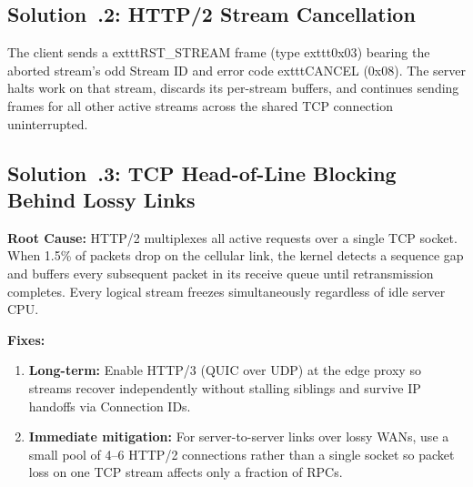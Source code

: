 \subsection{Solution~\thechapter.2: HTTP/2 Stream Cancellation}
The client sends a 	exttt{RST\_STREAM} frame (type 	exttt{0x03}) bearing the aborted stream's odd Stream ID and error code 	exttt{CANCEL (0x08)}. The server halts work on that stream, discards its per-stream buffers, and continues sending frames for all other active streams across the shared TCP connection uninterrupted.

\subsection{Solution~\thechapter.3: TCP Head-of-Line Blocking Behind Lossy Links}
\textbf{Root Cause:} HTTP/2 multiplexes all active requests over a single TCP socket. When 1.5\% of packets drop on the cellular link, the kernel detects a sequence gap and buffers every subsequent packet in its receive queue until retransmission completes. Every logical stream freezes simultaneously regardless of idle server CPU.

\textbf{Fixes:}
\begin{enumerate}[leftmargin=15pt]
  \item \textbf{Long-term:} Enable HTTP/3 (QUIC over UDP) at the edge proxy so streams recover independently without stalling siblings and survive IP handoffs via Connection IDs.
  \item \textbf{Immediate mitigation:} For server-to-server links over lossy WANs, use a small pool of 4--6 HTTP/2 connections rather than a single socket so packet loss on one TCP stream affects only a fraction of RPCs.
\end{enumerate}

